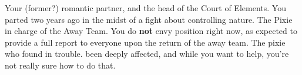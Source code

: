 \documentclass[char]{PP}
\begin{document}
\begin{contacts}
	\contact{\cEHead{}} Your (former?) romantic partner, and the head of the Court of Elements. You parted two years ago in the midst of a fight about \cEHead{\their} controlling nature.
	\contact{\cSPM{}} The Pixie in charge of the Away Team. You do \textbf{not} envy \cSPM{\their} position right now, as \cSPM{\they} \cSPM{\are} expected to provide a full report to everyone upon the return of the away team.
	\contact{\cMChange{}} The pixie who found \cFLost{} in trouble. \cMChange{\They} \cMChange{\have} been deeply affected, and while you want to help, you’re not really sure how to do that.
\end{contacts}
\end{document}
